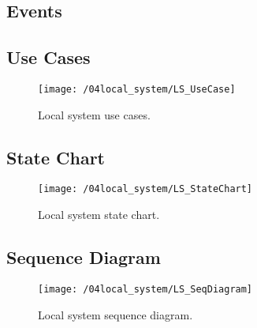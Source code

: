 \subsection{Events}

\subsection{Use Cases}

\begin{figure}[ht]
	\centering
	\texttt{[image: /04local\_system/LS\_UseCase]}
	\caption{Local system use cases.}
	\label{fig:ls_use_cases}
\end{figure}

\subsection{State Chart}

\begin{figure}[ht]
	\centering
	\texttt{[image: /04local\_system/LS\_StateChart]}
	\caption{Local system state chart.}
	\label{fig:ls_state_chart}
\end{figure}

\subsection{Sequence Diagram}

\begin{figure}[ht]
	\centering
	\texttt{[image: /04local\_system/LS\_SeqDiagram]}
	\caption{Local system sequence diagram.}
	\label{fig:ls_seq_diagram}
\end{figure}